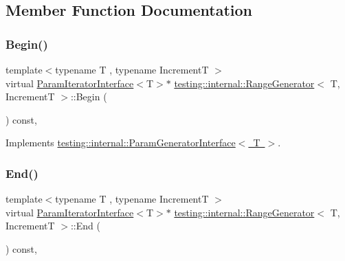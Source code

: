 \subsection{Member Function Documentation}
\mbox{\label{classtesting_1_1internal_1_1RangeGenerator_ae68b59f9348ecf93e0947545a2424765}} 
\subsubsection{\texorpdfstring{Begin()}{Begin()}}
{\footnotesize\ttfamily template$<$typename T , typename IncrementT $>$ \\
virtual \mbox{\hyperlink{classtesting_1_1internal_1_1ParamIteratorInterface}{Param\+Iterator\+Interface}}$<$T$>$$\ast$ \mbox{\hyperlink{classtesting_1_1internal_1_1RangeGenerator}{testing\+::internal\+::\+Range\+Generator}}$<$ T, IncrementT $>$\+::Begin (\begin{DoxyParamCaption}{ }\end{DoxyParamCaption}) const\hspace{0.3cm}{\ttfamily [inline]}, {\ttfamily [virtual]}}



Implements \mbox{\hyperlink{classtesting_1_1internal_1_1ParamGeneratorInterface_ae1de83b16fe9a53c67778a026c6a9569}{testing\+::internal\+::\+Param\+Generator\+Interface$<$ T $>$}}.

\mbox{\label{classtesting_1_1internal_1_1RangeGenerator_a8d2acbb733791a14df6e7bd3754e9003}} 
\subsubsection{\texorpdfstring{End()}{End()}}
{\footnotesize\ttfamily template$<$typename T , typename IncrementT $>$ \\
virtual \mbox{\hyperlink{classtesting_1_1internal_1_1ParamIteratorInterface}{Param\+Iterator\+Interface}}$<$T$>$$\ast$ \mbox{\hyperlink{classtesting_1_1internal_1_1RangeGenerator}{testing\+::internal\+::\+Range\+Generator}}$<$ T, IncrementT $>$\+::End (\begin{DoxyParamCaption}{ }\end{DoxyParamCaption}) const\hspace{0.3cm}{\ttfamily [inline]}, {\ttfamily [virtual]}}



